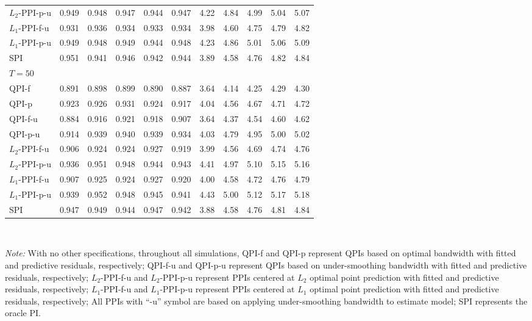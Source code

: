 \documentclass[a4paper]{article}
\begin{document}
\begin{table}[H]
\begin{tabular}{lcccccccccc}
  $L_2$-PPI-p-u & 0.949 & 0.948 & 0.947 & 0.944 & 0.947 & 4.22 & 4.84 & 4.99 & 5.04 & 5.07 \\ 
  $L_1$-PPI-f-u & 0.931 & 0.936 & 0.934 & 0.933 & 0.934 & 3.98 & 4.60 & 4.75 & 4.79 & 4.82 \\ 
  $L_1$-PPI-p-u & 0.949 & 0.948 & 0.949 & 0.944 & 0.948 & 4.23 & 4.86 & 5.01 & 5.06 & 5.09 \\ 
  SPI & 0.951 & 0.941 & 0.946 & 0.942 & 0.944& 3.89 & 4.58 & 4.76 & 4.82 & 4.84  \\ [3pt]
    $T = 50$        &       &       &       &       &  \\[3pt]
QPI-f & 0.891 & 0.898 & 0.899 & 0.890 & 0.887 & 3.64 & 4.14 & 4.25 & 4.29 & 4.30  \\ 
  QPI-p & 0.923 & 0.926 & 0.931 & 0.924 & 0.917 & 4.04 & 4.56 & 4.67 & 4.71 & 4.72 \\ 
  QPI-f-u & 0.884 & 0.916 & 0.921 & 0.918 & 0.907 & 3.64 & 4.37 & 4.54 & 4.60 & 4.62 \\ 
  QPI-p-u & 0.914 & 0.939 & 0.940 & 0.939 & 0.934 & 4.03 & 4.79 & 4.95 & 5.00 & 5.02 \\ 
  $L_2$-PPI-f-u & 0.906 & 0.924 & 0.924 & 0.927 & 0.919 & 3.99 & 4.56 & 4.69 & 4.74 & 4.76 \\ 
  $L_2$-PPI-p-u & 0.936 & 0.951 & 0.948 & 0.944 & 0.943 & 4.41 & 4.97 & 5.10 & 5.15 & 5.16 \\ 
  $L_1$-PPI-f-u & 0.907 & 0.925 & 0.924 & 0.927 & 0.920 & 4.00 & 4.58 & 4.72 & 4.76 & 4.79 \\ 
  $L_1$-PPI-p-u & 0.939 & 0.952 & 0.948 & 0.945 & 0.941 & 4.43 & 5.00 & 5.12 & 5.17 & 5.18 \\ 
  SPI & 0.947 & 0.949 & 0.944 & 0.947 & 0.942 & 3.88 & 4.58 & 4.76 & 4.81 & 4.84 \\ 
       \bottomrule
    \end{tabular}\\
      \raggedright
     \textit{Note:} With no other specifications, throughout all simulations, QPI-f and QPI-p represent QPIs based on optimal bandwidth with fitted and predictive residuals, respectively; QPI-f-u and QPI-p-u represent QPIs based on under-smoothing bandwidth with fitted and predictive residuals, respectively; $L_2$-PPI-f-u and $L_2$-PPI-p-u represent PPIs centered at $L_2$ optimal point prediction with fitted and predictive residuals, respectively;  $L_1$-PPI-f-u and $L_1$-PPI-p-u represent PPIs centered at $L_1$ optimal point prediction with fitted and predictive residuals, respectively; All PPIs with ``-u'' symbol are based on applying under-smoothing bandwidth to estimate model; SPI represents the oracle PI. 
\end{table}
\end{document}
